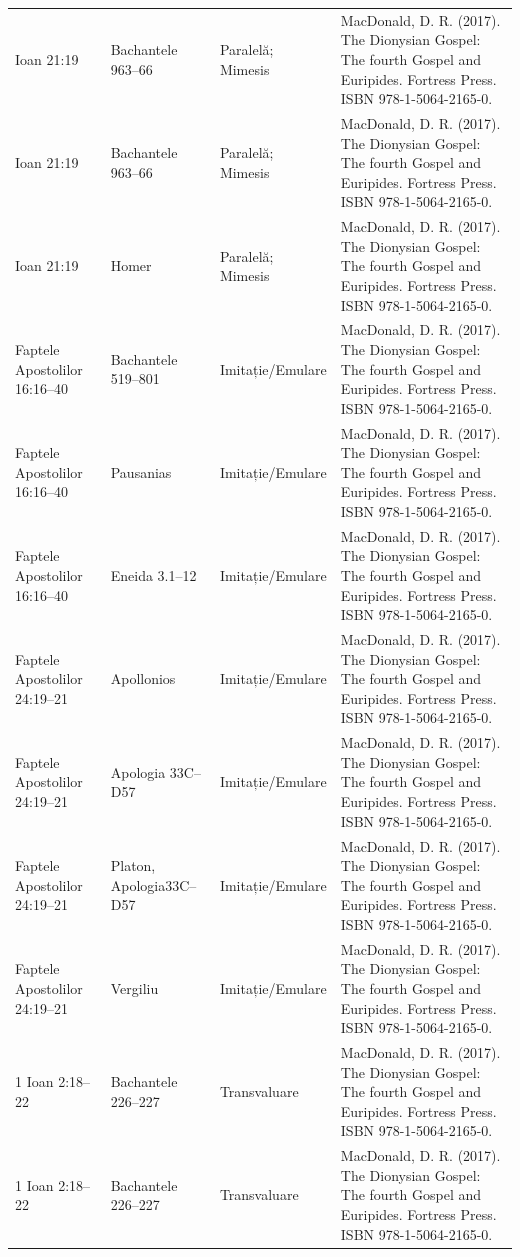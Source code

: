 \documentclass[12pt,a4paper,twoside,openany]{book}
\begin{document}
\begin{longtable}{L{1.4cm}L{1.7cm}L{3.1cm}L{8.4cm}}
Ioan 21:19 & Bachantele 963–66 & Paralelă; Mimesis & MacDonald, D. R. (2017). The Dionysian Gospel: The fourth Gospel and Euripides. Fortress Press. ISBN 978-1-5064-2165-0. \\
Ioan 21:19 & Bachantele 963–66 & Paralelă; Mimesis & MacDonald, D. R. (2017). The Dionysian Gospel: The fourth Gospel and Euripides. Fortress Press. ISBN 978-1-5064-2165-0. \\
Ioan 21:19 & Homer & Paralelă; Mimesis & MacDonald, D. R. (2017). The Dionysian Gospel: The fourth Gospel and Euripides. Fortress Press. ISBN 978-1-5064-2165-0. \\
Faptele Apostolilor 16:16–40 & Bachantele 519–801 & Imitație/Emulare & MacDonald, D. R. (2017). The Dionysian Gospel: The fourth Gospel and Euripides. Fortress Press. ISBN 978-1-5064-2165-0. \\
Faptele Apostolilor 16:16–40 & Pausanias & Imitație/Emulare & MacDonald, D. R. (2017). The Dionysian Gospel: The fourth Gospel and Euripides. Fortress Press. ISBN 978-1-5064-2165-0. \\
Faptele Apostolilor 16:16–40 & Eneida 3.1–12 & Imitație/Emulare & MacDonald, D. R. (2017). The Dionysian Gospel: The fourth Gospel and Euripides. Fortress Press. ISBN 978-1-5064-2165-0. \\
Faptele Apostolilor 24:19–21 & Apollonios & Imitație/Emulare & MacDonald, D. R. (2017). The Dionysian Gospel: The fourth Gospel and Euripides. Fortress Press. ISBN 978-1-5064-2165-0. \\
Faptele Apostolilor 24:19–21 & Apologia 33C–D57 & Imitație/Emulare & MacDonald, D. R. (2017). The Dionysian Gospel: The fourth Gospel and Euripides. Fortress Press. ISBN 978-1-5064-2165-0. \\
Faptele Apostolilor 24:19–21 & Platon, Apologia33C–D57 & Imitație/Emulare & MacDonald, D. R. (2017). The Dionysian Gospel: The fourth Gospel and Euripides. Fortress Press. ISBN 978-1-5064-2165-0. \\
Faptele Apostolilor 24:19–21 & Vergiliu & Imitație/Emulare & MacDonald, D. R. (2017). The Dionysian Gospel: The fourth Gospel and Euripides. Fortress Press. ISBN 978-1-5064-2165-0. \\
1 Ioan 2:18–22 & Bachantele 226–227 & Transvaluare & MacDonald, D. R. (2017). The Dionysian Gospel: The fourth Gospel and Euripides. Fortress Press. ISBN 978-1-5064-2165-0. \\
1 Ioan 2:18–22 & Bachantele 226–227 & Transvaluare & MacDonald, D. R. (2017). The Dionysian Gospel: The fourth Gospel and Euripides. Fortress Press. ISBN 978-1-5064-2165-0. \\

\end{longtable}
\end{document}
